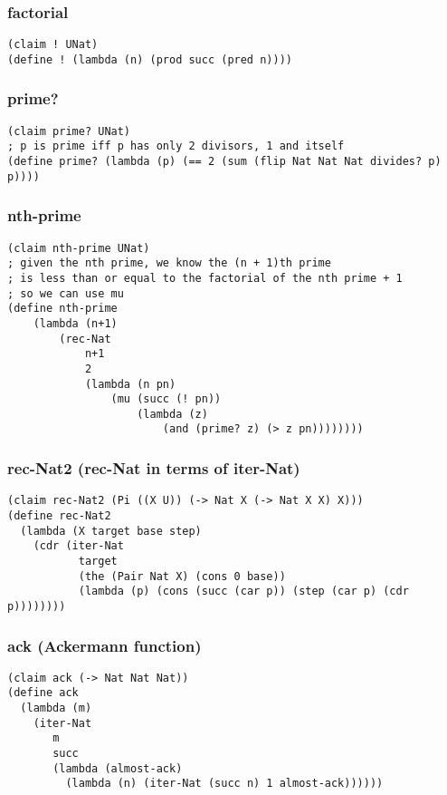 \subsubsection{factorial} \label{code:factorial}
\begin{lstlisting}
(claim ! UNat)
(define ! (lambda (n) (prod succ (pred n))))
\end{lstlisting}

\subsubsection{prime?} \label{code:prime?}
\begin{lstlisting}
(claim prime? UNat)
; p is prime iff p has only 2 divisors, 1 and itself
(define prime? (lambda (p) (== 2 (sum (flip Nat Nat Nat divides? p) p))))
\end{lstlisting}

\subsubsection{nth-prime} \label{code:nth-prime}
\begin{lstlisting}
(claim nth-prime UNat)
; given the nth prime, we know the (n + 1)th prime
; is less than or equal to the factorial of the nth prime + 1
; so we can use mu
(define nth-prime
    (lambda (n+1)
        (rec-Nat
            n+1
            2
            (lambda (n pn) 
                (mu (succ (! pn)) 
                    (lambda (z) 
                        (and (prime? z) (> z pn))))))))
\end{lstlisting}

\subsubsection{rec-Nat2 (rec-Nat in terms of iter-Nat)} \label{code:rec-Nat2}
\begin{lstlisting}
(claim rec-Nat2 (Pi ((X U)) (-> Nat X (-> Nat X X) X)))
(define rec-Nat2
  (lambda (X target base step)
    (cdr (iter-Nat
           target
           (the (Pair Nat X) (cons 0 base))
           (lambda (p) (cons (succ (car p)) (step (car p) (cdr p))))))))
\end{lstlisting}

\subsubsection{ack (Ackermann function)} \label{code:ack}
\begin{lstlisting}
(claim ack (-> Nat Nat Nat))
(define ack
  (lambda (m)
    (iter-Nat
       m
       succ
       (lambda (almost-ack)
         (lambda (n) (iter-Nat (succ n) 1 almost-ack))))))
\end{lstlisting}

